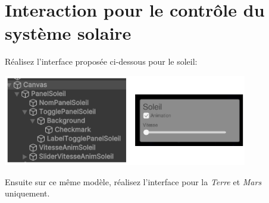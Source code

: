 \documentclass[a4paper,10pt]{article}
\begin{document}
\section{Interaction pour le contrôle du système solaire}

Réalisez l'interface proposée ci-dessous pour le soleil:
\begin{center}
	\includegraphics[width=0.8\textwidth]{fig/ui_control-sun_complete}
\end{center}

Ensuite sur ce même modèle, réalisez l'interface pour la \textit{Terre} et \textit{Mars} uniquement. 
\end{document}
